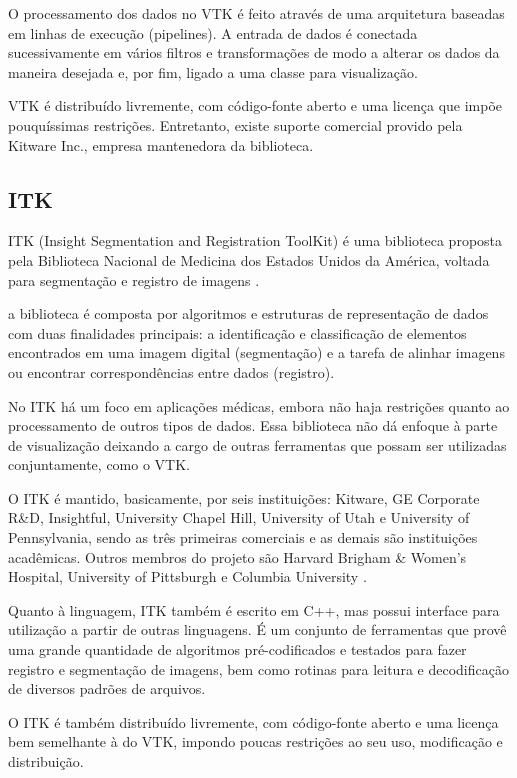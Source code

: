 O processamento dos dados no VTK é feito através de uma arquitetura baseadas em linhas de execução (pipelines). A entrada de dados é conectada sucessivamente em vários filtros e transformações de modo a alterar os dados da maneira desejada e, por fim, ligado a uma classe para visualização.

VTK é distribuído livremente, com código-fonte aberto e uma licença que impõe pouquíssimas restrições. Entretanto, existe suporte comercial provido pela Kitware Inc., empresa mantenedora da biblioteca.

\subsection{ITK}

ITK (Insight Segmentation and Registration ToolKit) é uma biblioteca proposta pela Biblioteca Nacional de Medicina dos Estados Unidos da América, voltada para segmentação e registro de imagens \cite{yoo}.

a biblioteca é composta por algoritmos e estruturas de representação de dados com duas finalidades principais: a identificação e classificação de elementos encontrados em uma imagem digital (segmentação) e a tarefa de alinhar imagens ou encontrar correspondências entre dados (registro).

No ITK há um foco em aplicações médicas, embora não haja restrições quanto ao processamento de outros tipos de dados. Essa biblioteca não dá enfoque à parte de visualização deixando a cargo de outras ferramentas que possam ser utilizadas conjuntamente, como o VTK.

O ITK é mantido, basicamente, por seis instituições: Kitware, GE Corporate R\&D, Insightful, University Chapel Hill, University of Utah e University of Pennsylvania, sendo as três primeiras comerciais e as demais são instituições acadêmicas. Outros membros do projeto são Harvard Brigham \& Women's Hospital, University of Pittsburgh e Columbia University \cite{itk-page}.

Quanto à linguagem, ITK também é escrito em C++, mas possui interface para utilização a partir de outras linguagens. É um conjunto de ferramentas que provê uma grande quantidade de algoritmos pré-codificados e testados para fazer registro e segmentação de imagens, bem como rotinas para leitura e decodificação de diversos padrões de arquivos.

O ITK é também distribuído livremente, com código-fonte aberto e uma licença bem semelhante à do VTK, impondo poucas restrições ao seu uso, modificação e distribuição.

